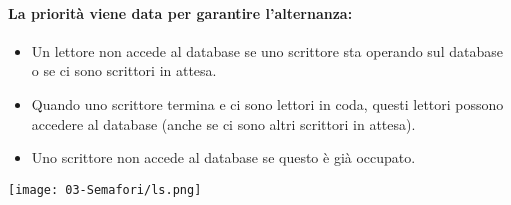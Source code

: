 \paragraph{La priorità viene data per garantire l'alternanza:}

\begin{itemize}
	\item Un lettore non accede al database se uno scrittore sta operando sul
	      database o se ci sono scrittori in attesa.
	\item Quando uno scrittore termina e ci sono lettori in coda, questi lettori
	      possono accedere al database (anche se ci sono altri scrittori in attesa).
	\item Uno scrittore non accede al database se questo è già occupato.
\end{itemize}

\begin{center}
	\texttt{[image: 03-Semafori/ls.png]}
\end{center}
